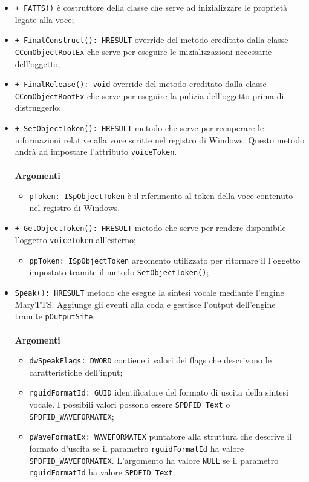 \begin{itemize}
	\item \texttt{+ FATTS()} è costruttore della classe che serve ad inizializzare le proprietà legate alla voce;
	\item \texttt{+ FinalConstruct(): HRESULT} override del metodo ereditato dalla classe \texttt{CComObjectRootEx} che serve per eseguire le inizializzazioni necessarie dell'oggetto;
	\item \texttt{+ FinalRelease(): void} override del metodo ereditato dalla classe \texttt{CComObjectRootEx} che serve per eseguire la pulizia dell'oggetto prima di distruggerlo;
	\item \texttt{+ SetObjectToken(): HRESULT} metodo che serve per recuperare le informazioni relative alla voce scritte nel registro di Windows. Questo metodo andrà ad impostare l'attributo \texttt{voiceToken}.\\\\
	\textbf{Argomenti}
	\begin{itemize}
		\item \texttt{pToken: ISpObjectToken} è il riferimento al token della voce contenuto nel registro di Windows. 
	\end{itemize}
	\item \texttt{+ GetObjectToken(): HRESULT} metodo che serve per rendere disponibile l'oggetto \texttt{voiceToken} all'esterno;
	\begin{itemize}
		\item \texttt{ppToken: ISpObjectToken} argomento utilizzato per ritornare il l'oggetto impostato tramite il metodo \texttt{SetObjectToken()};
	\end{itemize}
	\item \texttt{Speak(): HRESULT} metodo che esegue la sintesi vocale mediante l'engine MaryTTS. Aggiunge gli eventi alla coda e gestisce l'output dell'engine tramite \texttt{pOutputSite}.\\\\
	\textbf{Argomenti}
	\begin{itemize}
		\item \texttt{dwSpeakFlags: DWORD} contiene i valori dei flags che descrivono le caratteristiche dell'input;
		\item \texttt{rguidFormatId: GUID} identificatore del formato di uscita della sintesi vocale. I possibili valori possono essere \texttt{SPDFID\_Text} o \texttt{SPDFID\_WAVEFORMATEX};
		\item \texttt{pWaveFormatEx: WAVEFORMATEX} puntatore alla struttura che descrive il formato d'uscita se il parametro \texttt{rguidFormatId} ha valore \texttt{SPDFID\_WAVEFORMATEX}. L'argomento ha valore \texttt{NULL} se il parametro \texttt{rguidFormatId} ha valore \texttt{SPDFID\_Text};

\end{itemize}
\end{itemize}

